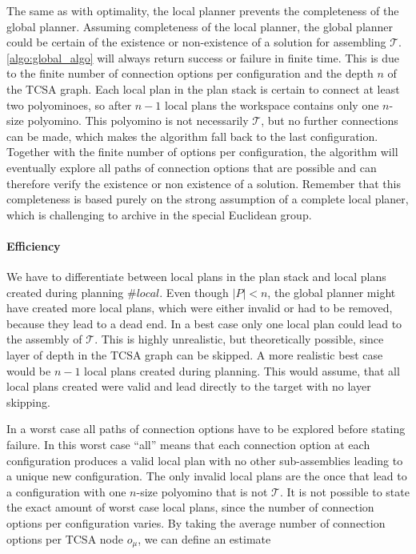 The same as with optimality, the local planner prevents the completeness of the global planner.
Assuming completeness of the local planner, the global planner could be certain of the existence or non-existence of a solution for assembling $\mathcal{T}$.
\autoref{algo:global_algo} will always return success or failure in finite time.
This is due to the finite number of connection options per configuration and the depth $n$ of the TCSA graph.
Each local plan in the plan stack is certain to connect at least two polyominoes, so after $n-1$ local plans the workspace contains only one $n$-size polyomino.
This polyomino is not necessarily $\mathcal{T}$, but no further connections can be made, which makes the algorithm fall back to the last configuration.
Together with the finite number of options per configuration, the algorithm will eventually explore all paths of connection options that are possible and can therefore verify the existence or non existence of a solution.
Remember that this completeness is based purely on the strong assumption of a complete local planer, which is challenging to archive in the special Euclidean group.

\paragraph{Efficiency}

We have to differentiate between local plans in the plan stack and local plans created during planning $\#\textit{local}$.
Even though $|P| < n$, the global planner might have created more local plans, which were either invalid or had to be removed, because they lead to a dead end.
In a best case only one local plan could lead to the assembly of $\mathcal{T}$.
This is highly unrealistic, but theoretically possible, since layer of depth in the TCSA graph can be skipped.
A more realistic best case would be $n-1$ local plans created during planning. 
This would assume, that all local plans created were valid and lead directly to the target with no layer skipping.

In a worst case all paths of connection options have to be explored before stating failure.
In this worst case ``all'' means that each connection option at each configuration produces a valid local plan with no other sub-assemblies leading to a unique new configuration.
The only invalid local plans are the once that lead to a configuration with one $n$-size polyomino that is not $\mathcal{T}$.
It is not possible to state the exact amount of worst case local plans, since the number of connection options per configuration varies.
By taking the average number of connection options per TCSA node $o_\mu$, we can define an estimate

